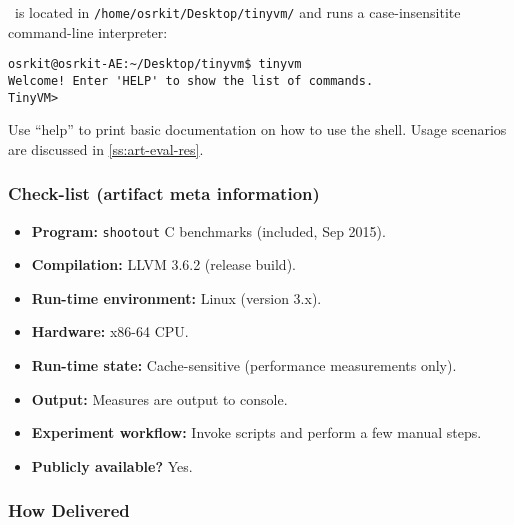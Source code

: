 \tinyvm\ is located in {\small\tt /home/osrkit/Desktop/tinyvm/} and runs a case-insensitite command-line interpreter:
\begin{small}
\begin{verbatim}
osrkit@osrkit-AE:~/Desktop/tinyvm$ tinyvm
Welcome! Enter 'HELP' to show the list of commands.
TinyVM> 
\end{verbatim}
\end{small}

\noindent Use ``help'' to print basic documentation on how to use the shell. Usage scenarios are discussed in \ref{ss:art-eval-res}.

\subsubsection{Check-list (artifact meta information)}


{\small
\begin{itemize}[parsep=0pt]
  \item {\bf Program: } {\tt shootout} C benchmarks (included, Sep 2015). %
  \item {\bf Compilation: } LLVM 3.6.2 (release build).
  \item {\bf Run-time environment: } Linux (version 3.x).
  \item {\bf Hardware: } x86-64 CPU.
  \item {\bf Run-time state: } Cache-sensitive (performance measurements only).
  \item {\bf Output: } Measures are output to console.
  \item {\bf Experiment workflow: } Invoke scripts and perform a few manual steps.
  \item {\bf Publicly available?} Yes.
\end{itemize}
}

\subsubsection{How Delivered}

